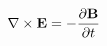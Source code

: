 \documentclass[preview]{standalone}
\begin{document}
\begin{align*}
\nabla \times \mathbf{E} = - \pdv{\mathbf{B}}{t}
\end{align*}
\end{document}

